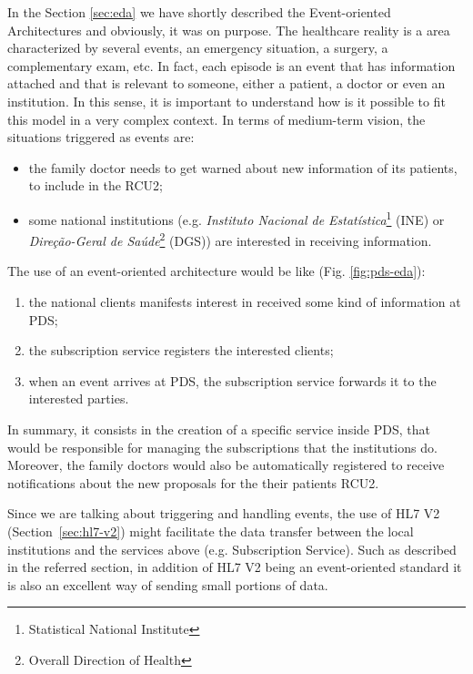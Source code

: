 In the Section \ref{sec:eda} we have shortly described the Event-oriented Architectures and obviously, it was on purpose. The healthcare reality is a area characterized by several events, an emergency situation, a surgery, a complementary exam, etc. In fact, each episode is an event that has information attached and that is relevant to someone, either a patient, a doctor or even an institution. In this sense, it is important to understand how is it possible to fit this model in a very complex context. In terms of medium-term vision, the situations triggered as events are:
\begin{itemize}
\item the family doctor needs to get warned about new information of its patients, to include in the RCU2;
\item some national institutions (e.g. \textit{Instituto Nacional de Estatística}\footnote{Statistical National Institute} (INE) or \textit{Direção-Geral de Saúde}\footnote{Overall Direction of Health} (DGS)) are interested in receiving information.
\end{itemize}


The use of an event-oriented architecture would be like (Fig. \ref{fig:pds-eda}):
\begin{enumerate}
\item the national clients manifests interest in received some kind of information at PDS;
\item the subscription service registers the interested clients;
\item when an event arrives at PDS, the subscription service forwards it to the interested parties.
\end{enumerate}

In summary, it consists in the creation of a specific service inside PDS, that would be responsible for managing the subscriptions that the institutions do. Moreover, the family doctors would also be automatically registered to receive notifications about the new proposals for the their patients RCU2.

Since we are talking about triggering and handling events, the use of HL7 V2 (Section~\ref{sec:hl7-v2}) might facilitate the data transfer between the local institutions and the services above (e.g. Subscription Service). Such as described in the referred section, in addition of HL7 V2 being an event-oriented standard it is also an excellent way of sending small portions of data.


